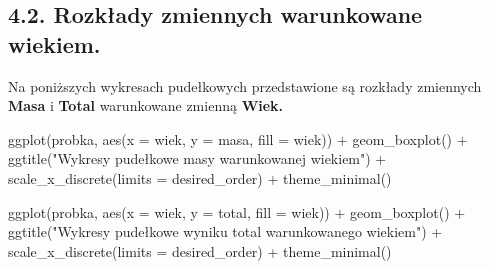 \documentclass[
  letterpaper,
  DIV=11,
  numbers=noendperiod]{scrartcl}
\newenvironment{Shaded}{\begin{snugshade}}{\end{snugshade}}
\newcommand{\AttributeTok}[1]{\textcolor[rgb]{0.40,0.45,0.13}{#1}}
\newcommand{\FunctionTok}[1]{\textcolor[rgb]{0.28,0.35,0.67}{#1}}
\newcommand{\NormalTok}[1]{\textcolor[rgb]{0.00,0.23,0.31}{#1}}
\newcommand{\SpecialCharTok}[1]{\textcolor[rgb]{0.37,0.37,0.37}{#1}}
\newcommand{\StringTok}[1]{\textcolor[rgb]{0.13,0.47,0.30}{#1}}
\begin{document}
\hypertarget{rozkux142ady-zmiennych-warunkowane-wiekiem.}{%
\subsection{4.2. Rozkłady zmiennych warunkowane
wiekiem.}\label{rozkux142ady-zmiennych-warunkowane-wiekiem.}}

Na poniższych wykresach pudełkowych przedstawione są rozkłady zmiennych
\textbf{Masa} i \textbf{Total} warunkowane zmienną \textbf{Wiek.}

\begin{Shaded}
\begin{Highlighting}[]
\FunctionTok{ggplot}\NormalTok{(probka, }\FunctionTok{aes}\NormalTok{(}\AttributeTok{x =}\NormalTok{ wiek, }\AttributeTok{y =}\NormalTok{ masa, }\AttributeTok{fill =}\NormalTok{ wiek)) }\SpecialCharTok{+}
  \FunctionTok{geom\_boxplot}\NormalTok{() }\SpecialCharTok{+}
  \FunctionTok{ggtitle}\NormalTok{(}\StringTok{"Wykresy pudełkowe masy warunkowanej wiekiem"}\NormalTok{) }\SpecialCharTok{+}
  \FunctionTok{scale\_x\_discrete}\NormalTok{(}\AttributeTok{limits =}\NormalTok{ desired\_order) }\SpecialCharTok{+} 
  \FunctionTok{theme\_minimal}\NormalTok{()}

\FunctionTok{ggplot}\NormalTok{(probka, }\FunctionTok{aes}\NormalTok{(}\AttributeTok{x =}\NormalTok{ wiek, }\AttributeTok{y =}\NormalTok{ total, }\AttributeTok{fill =}\NormalTok{ wiek)) }\SpecialCharTok{+}
  \FunctionTok{geom\_boxplot}\NormalTok{() }\SpecialCharTok{+}
  \FunctionTok{ggtitle}\NormalTok{(}\StringTok{"Wykresy pudełkowe wyniku total warunkowanego wiekiem"}\NormalTok{) }\SpecialCharTok{+}
  \FunctionTok{scale\_x\_discrete}\NormalTok{(}\AttributeTok{limits =}\NormalTok{ desired\_order) }\SpecialCharTok{+} 
  \FunctionTok{theme\_minimal}\NormalTok{()}
\end{Highlighting}
\end{Shaded}
\end{document}
